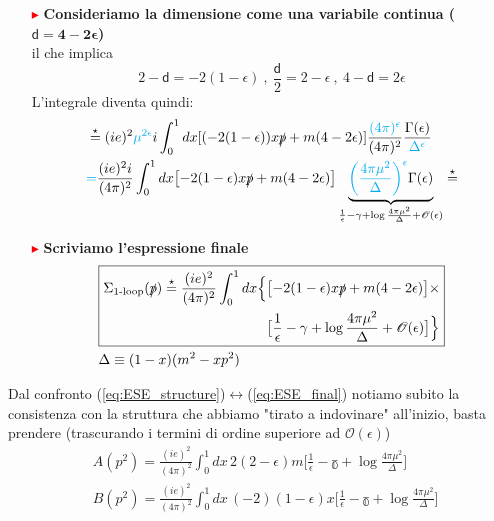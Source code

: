 \documentclass[../main.tex]{subfiles}
\begin{document}
\begin{itemize}
    \item[\textcolor{Red}{$\blacktriangleright$}] \textbf{Consideriamo la dimensione come una variabile continua ($\mathbf{\mathsf d = 4 - 2\epsilon}$)}\\
    il che implica 
    \[
    2-\mathsf d = -2(1-\epsilon) ~,~ \frac{\mathsf d}{2}=2-\epsilon ~,~ 4-\mathsf d = 2\epsilon
    \]
    L'integrale diventa quindi:
    \begin{align*}
    &\overset{\star}{=}  (ie)^2 \textcolor{cyan}{\mu^{2\epsilon}} i \int_0^1 dx [(-2(1-\epsilon))x\slashed p + m (4-2\epsilon)] \frac{\textcolor{cyan}{(4\pi)^\epsilon}}{(4\pi)^2} \frac{\Gamma(\epsilon)}{\textcolor{cyan}{\Delta^{\epsilon}}}  \\ 
    &\textcolor{cyan}{=} \frac{(ie)^2i}{(4\pi)^2} \int_0^1 dx \bigl[ -2(1-\epsilon)x\slashed p + m (4-2\epsilon) \bigr] \underbrace{\textcolor{cyan}{\bigg(\frac{4\pi \mu^{2}}{\Delta}\bigg)^\epsilon} \Gamma(\epsilon)}_{\frac{1}{\epsilon} - \mathbb\gamma + \log{\frac{4\pi \mu^{2}}{\Delta}} +\mathscr{O}(\epsilon)} \overset{\star}{=}    
    \end{align*}
        
    \item[\textcolor{Red}{$\blacktriangleright$}] \textbf{Scriviamo l'espressione finale}\\
    \begin{equation}
        \begin{aligned}
            &\boxed{
            \begin{aligned}
                    \Sigma_\text{1-loop}(\slashed p) \overset{\star}{=} \frac{(ie)^2}{(4\pi)^2} \int_0^1 dx \Bigl\{&\bigl[ -2(1-\epsilon)x\slashed p +m(4-2\epsilon) \bigr] \times \\ &\bigl[ \frac{1}{\epsilon} - \mathbb\gamma + \log{\frac{4\pi \mu^{2}}{\Delta}} +\mathscr{O}(\epsilon) \bigr] \Bigr\}
            \end{aligned}}\\
        &\Delta \equiv (1-x)(m^2 - xp^2)
        \end{aligned}
        \label{eq:ESE_final}
    \end{equation}
\end{itemize}

Dal confronto (\ref{eq:ESE_structure})$\leftrightarrow$(\ref{eq:ESE_final}) notiamo subito la consistenza con la struttura che abbiamo "tirato a indovinare" all'inizio, basta prendere (trascurando i termini di ordine superiore ad $\mathscr{O}(\epsilon)$)
\begin{align*}
    & A(p^2) = \frac{(ie)^2}{(4\pi)^2} \int_0^1 dx\, 2(2-\epsilon)m \bigg[ \frac{1}{\epsilon} - \mathbb\gamma + \log{\frac{4\pi \mu^{2}}{\Delta}}\bigg]\\
    & B(p^2)  = \frac{(ie)^2}{(4\pi)^2} \int_0^1 dx \,(-2)(1-\epsilon)x \bigg[ \frac{1}{\epsilon} - \mathbb\gamma + \log{\frac{4\pi \mu^{2}}{\Delta}} \bigg]
\end{align*}
\end{document}
